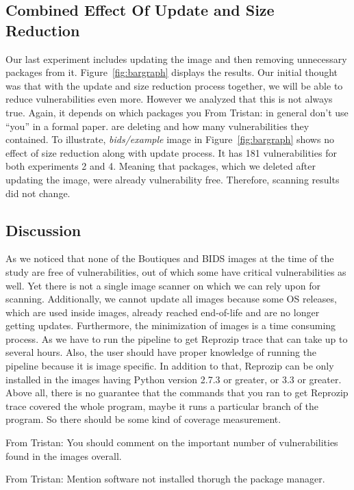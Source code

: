 \documentclass[a4paper,num-refs]{oup-contemporary}
\newcommand{\tristan}[1]{\color{blue}From Tristan: #1\color{black}}
\begin{document}
\subsection{Combined Effect Of Update and Size Reduction}

Our last experiment includes updating the image and then removing unnecessary packages from it.
Figure~\ref{fig:bargraph} displays the results. 
Our initial thought was that with the update and size reduction process together, we will be able to
reduce vulnerabilities even more. However
we analyzed that this is not always true. Again, it depends on which packages you \tristan{in general don't use ``you'' in a 
formal paper.} are deleting and how
many vulnerabilities they contained. To illustrate, \textit{bids/example} image in Figure~\ref{fig:bargraph}
shows no effect of size reduction along with update process. It has 181 vulnerabilities for both experiments 2 and 4.
Meaning that packages, which we deleted after updating the image, were already vulnerability free. Therefore,
scanning results did not change.

\subsection{Discussion}

As we noticed that none of the Boutiques and BIDS images at the time of the study are free of vulnerabilities, out of which
some have critical vulnerabilities as well. Yet there is not a single image scanner on which we can rely upon for
scanning. Additionally, we cannot update all images because some OS releases, which are used inside images, 
already reached end-of-life and are
no longer getting updates. Furthermore, the minimization of images is a time consuming process. As we have to run
the pipeline to get Reprozip trace that can take up to several hours. Also, the user should have proper knowledge
of running the pipeline because it is image specific. In addition to that, Reprozip can be only installed
in the images having Python version 2.7.3 or greater, or 3.3 or greater. Above all, there is no guarantee that
the commands that you ran to get Reprozip trace covered the whole program, maybe it runs a particular
branch of the program. So there should be some kind of coverage measurement.

\tristan{You should comment on the important number of vulnerabilities found in the images overall.}

\tristan{Mention software not installed thorugh the package manager.}
\end{document}
